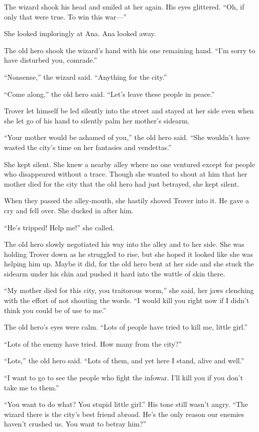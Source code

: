 The wizard shook his head and smiled at her again. His eyes
glittered. “Oh, if only that were true. To win this war—”

She looked imploringly at Ana. Ana looked away.

The old hero shook the wizard’s hand with his one remaining hand.
“I’m sorry to have disturbed you, comrade.”

“Nonsense,” the wizard said. “Anything for the city.”

“Come along,” the old hero said. “Let’s leave these people in
peace.”

Trover let himself be led silently into the street and stayed at
her side even when she let go of his hand to silently palm her
mother’s sidearm.

“Your mother would be ashamed of you,” the old hero said. “She
wouldn’t have wasted the city’s time on her fantasies and
vendettas.”

She kept silent. She knew a nearby alley where no one ventured
except for people who disappeared without a trace. Though she
wanted to shout at him that her mother died for the city that the
old hero had just betrayed, she kept silent.

When they passed the alley-mouth, she hastily shoved Trover into
it. He gave a cry and fell over. She ducked in after him.

“He’s tripped! Help me!” she called.

The old hero slowly negotiated his way into the alley and to her
side. She was holding Trover down as he struggled to rise, but she
hoped it looked like she was helping him up. Maybe it did, for the
old hero bent at her side and she stuck the sidearm under his chin
and pushed it hard into the wattle of skin there.

“My mother died for this city, you traitorous worm,” she said, her
jaws clenching with the effort of not shouting the words. “I would
kill you right now if I didn’t think you could be of use to me.”

The old hero’s eyes were calm. “Lots of people have tried to kill
me, little girl.”

“Lots of the enemy have tried. How many from the city?”

“Lots,” the old hero said. “Lots of them, and yet here I stand,
alive and well.”

“I want to go to see the people who fight the infowar. I’ll kill
you if you don’t take me to them.”

“You want to do what? You stupid little girl.” His tone still
wasn’t angry. “The wizard there is the city’s best friend abroad.
He’s the only reason our enemies haven’t crushed us. You want to
betray him?”

